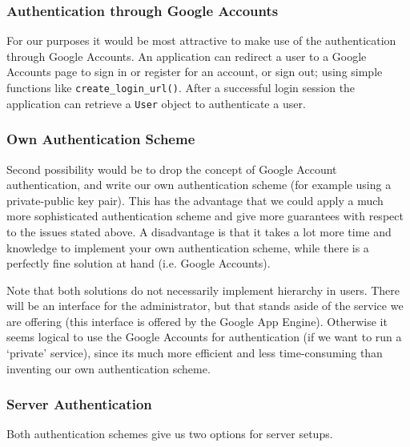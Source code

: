 \subsubsection{Authentication through Google Accounts}
For our purposes it would be most attractive to make use of the authentication
through Google Accounts. An application can redirect a user to a Google Accounts
page to sign in or register for an account, or sign out; using simple functions
like \texttt{create\_login\_url()}. After a successful login session the
application can retrieve a \texttt{User} object to authenticate a user.


\subsubsection{Own Authentication Scheme}
Second possibility would be to drop the concept of Google Account authentication,
and write our own authentication scheme (for example using a private-public key
pair). This has the advantage that we could apply a much more sophisticated
authentication scheme and give more guarantees with respect to the issues stated
above. A disadvantage is that it takes a lot more time and knowledge to implement
your own authentication scheme, while there is a perfectly fine solution at hand
(i.e. Google Accounts).

Note that both solutions do not necessarily implement hierarchy in users. There
will be an interface for the administrator, but that stands aside of the service
we are offering (this interface is offered by the Google App Engine). Otherwise
it seems logical to use the Google Accounts for authentication (if we want to run
a `private' service), since its much more efficient and less time-consuming than
inventing our own authentication scheme.


\subsubsection{Server Authentication}
Both authentication schemes give us two options for server setups.


